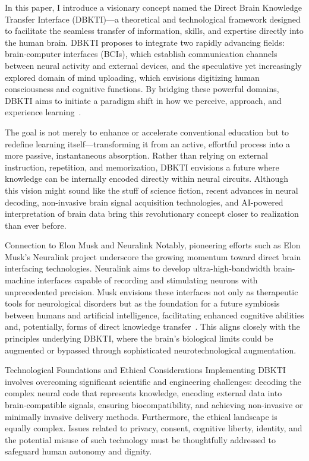 \documentclass[12pt]{article}
\begin{document}
In this paper, I introduce a visionary concept named the Direct Brain Knowledge Transfer Interface (DBKTI)—a theoretical and technological framework designed to facilitate the seamless transfer of information, skills, and expertise directly into the human brain. DBKTI proposes to integrate two rapidly advancing fields: brain-computer interfaces (BCIs), which establish communication channels between neural activity and external devices, and the speculative yet increasingly explored domain of mind uploading, which envisions digitizing human consciousness and cognitive functions. By bridging these powerful domains, DBKTI aims to initiate a paradigm shift in how we perceive, approach, and experience learning~\cite{awuah2024bridging}.

The goal is not merely to enhance or accelerate conventional education but to redefine learning itself—transforming it from an active, effortful process into a more passive, instantaneous absorption. Rather than relying on external instruction, repetition, and memorization, DBKTI envisions a future where knowledge can be internally encoded directly within neural circuits. Although this vision might sound like the stuff of science fiction, recent advances in neural decoding, non-invasive brain signal acquisition technologies, and AI-powered interpretation of brain data bring this revolutionary concept closer to realization than ever before.

Connection to Elon Musk and Neuralink
Notably, pioneering efforts such as Elon Musk’s Neuralink project underscore the growing momentum toward direct brain interfacing technologies. Neuralink aims to develop ultra-high-bandwidth brain-machine interfaces capable of recording and stimulating neurons with unprecedented precision. Musk envisions these interfaces not only as therapeutic tools for neurological disorders but as the foundation for a future symbiosis between humans and artificial intelligence, facilitating enhanced cognitive abilities and, potentially, forms of direct knowledge transfer~\cite{musk2023neuralink}. This aligns closely with the principles underlying DBKTI, where the brain's biological limits could be augmented or bypassed through sophisticated neurotechnological augmentation.

Technological Foundations and Ethical Considerations
Implementing DBKTI involves overcoming significant scientific and engineering challenges: decoding the complex neural code that represents knowledge, encoding external data into brain-compatible signals, ensuring biocompatibility, and achieving non-invasive or minimally invasive delivery methods. Furthermore, the ethical landscape is equally complex. Issues related to privacy, consent, cognitive liberty, identity, and the potential misuse of such technology must be thoughtfully addressed to safeguard human autonomy and dignity.
\end{document}
